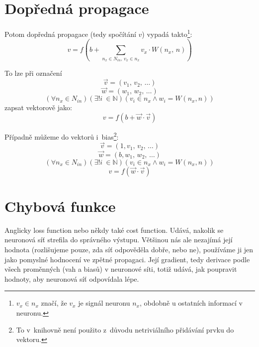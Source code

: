 \documentclass[12pt]{report}			%
\newcommand{\N}{\mathbb{N}}   			%
\begin{document}
				\section{Dopředná propagace}					
					Potom dopředná propagace (tedy spočítání $v$) vypadá takto\footnote{$v_x \in n_x$ značí, že $v_x$ je signál neuronu $n_x$, obdobně u ostatních informací v neuronu.}:
					\begin{equation} v = f\left(b + \sum_{n_x \in N_{in},\,v_x \in n_x} v_x \cdot W\left(n_x,\,n\right) \right) \label{eq:v} \end{equation}
				
					To lze při označení
					\begin{equation} \vec{v} = \left(v_{1},\,v_{2},\,\ldots\right) \label{eq:v} \end{equation}
					\begin{equation} \vec{w} = \left(w_{1},\,w_{2},\,\ldots\right) \end{equation}
					\begin{equation} \left(\forall n_x \in N_{in}\right)\left(\exists! i~\in \N\right)\left(v_i \in n_x \land w_i = W(n_x, n)\right) \end{equation}
					zapsat vektorově jako:
					\begin{equation} v = f\left(b + \vec{w} \cdot \vec{v} \right) \label{eq:fp} \end{equation}
				
					Případně můžeme do vektorů  i~bias\footnote{To v~knihovně není použito z~důvodu netriviálního přidávání prvku do vektoru.}:
					\begin{equation} \vec{v} = \left(1, v_{1},\,v_{2},\,\ldots\right) \end{equation}
					\begin{equation} \vec{w} = \left(b, w_{1},\,w_{2},\,\ldots\right) \end{equation}
					\begin{equation} \left(\forall n_x \in N_{in}\right)\left(\exists! i~\in \N\right)\left(v_i \in n_x \land w_i = W(n_x, n)\right) \end{equation}
					\begin{equation} v = f\left(\vec{w} \cdot \vec{v} \right) \label{eq:fpb} \end{equation}
					
				\section{Chybová funkce}
					Anglicky loss function nebo někdy také cost function. Udává, nakolik se neuronová síť strefila do správného výstupu. Většinou nás ale nezajímá její hodnota (rozlišujeme pouze, zda síť odpověděla dobře, nebo ne), používáme ji jen jako pomyslné hodnocení ve zpětné propagaci. Její \gls{gradient}, tedy derivace podle všech proměnných (vah a biasů) v neuronové síti, totiž udává, jak poupravit hodnoty, aby neuronová síť odpovídala lépe.
				
\end{document}
